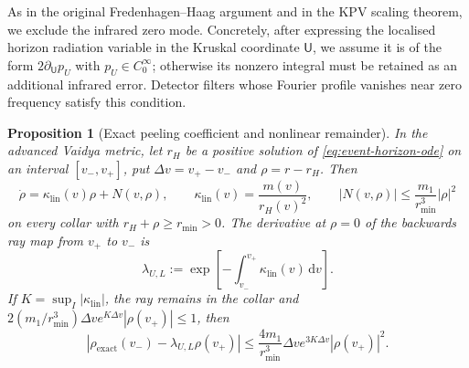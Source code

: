 \documentclass[11pt,a4paper]{article}
\newtheorem{proposition}[theorem]{Proposition}
\theoremstyle{definition}
\theoremstyle{remark}
\newcommand{\dd}{\mathrm d}
\begin{document}
	As in the original Fredenhagen--Haag argument and in the KPV scaling theorem,
	we exclude the infrared zero mode.  Concretely, after expressing the
	localised horizon radiation variable in the Kruskal coordinate $\mathsf U$,
	we assume it is of the form $2\partial_{\mathsf U}p_U$ with
	$p_U\in C_0^\infty$; otherwise its nonzero integral must be retained as an
	additional infrared error.  Detector filters whose Fourier profile vanishes
	near zero frequency satisfy this condition.
	
	\begin{proposition}[Exact peeling coefficient and nonlinear remainder]
		\label{prop:peeling-remainder}
		In the advanced Vaidya metric, let $r_H$ be a positive solution of
		\eqref{eq:event-horizon-ode} on an interval $[v_-,v_+]$, put
		$\Delta v=v_+-v_-$ and $\rho=r-r_H$.  Then
		\begin{equation}
			\dot\rho=\kappa_{\mathrm{lin}}(v)\rho+N(v,\rho),
			\qquad
			\kappa_{\mathrm{lin}}(v)=\frac{m(v)}{r_H(v)^2},
			\qquad
			|N(v,\rho)|\leq\frac{m_1}{r_{\min}^3}|\rho|^2
			\label{eq:exact-peeling-equation}
		\end{equation}
		on every collar with $r_H+\rho\geq r_{\min}>0$.  The derivative at
		$\rho=0$ of the backwards ray map from $v_+$ to $v_-$ is
		\begin{equation}
			\lambda_{U,L}:=\exp\!\left[-\int_{v_-}^{v_+}
			\kappa_{\mathrm{lin}}(v)\,\dd v\right].
			\label{eq:dynamic-scaling-form}
		\end{equation}
		If $K=\sup_I|\kappa_{\mathrm{lin}}|$, the ray remains in the collar and
		$2(m_1/r_{\min}^3)\Delta v e^{K\Delta v}|\rho(v_+)|\leq1$, then
		\begin{equation}
			|\rho_{\mathrm{exact}}(v_-)-\lambda_{U,L}\rho(v_+)|
			\leq \frac{4m_1}{r_{\min}^3}\Delta v
			e^{3K\Delta v}|\rho(v_+)|^2.
			\label{eq:nonlinear-peeling-bound}
		\end{equation}
	\end{proposition}
	
\end{document}
